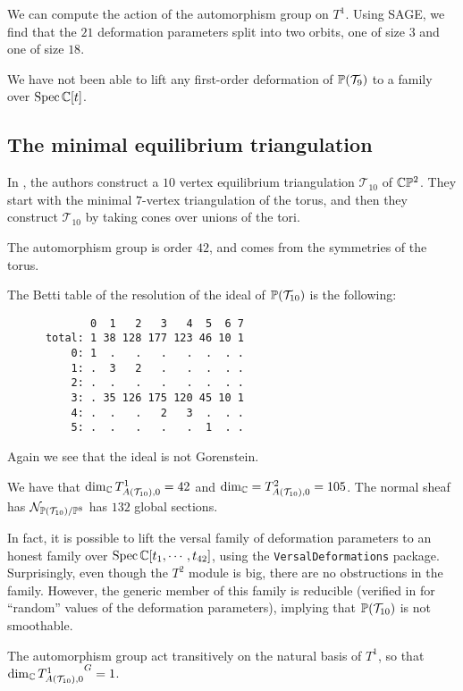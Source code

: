 We can compute the action of the automorphism group on $T^1$. Using SAGE, we find that the $21$ deformation parameters split into two orbits, one of size $3$ and one of size $18$.

We have not been able to lift any first-order deformation of $\P(\mathcal T_9)$ to a family over $\Spec \C[t]$. 

\subsection{The minimal equilibrium triangulation}

In \cite{banchoff_equilibrium}, the authors construct a $10$ vertex equilibrium triangulation $\mathcal T_{10}$  of $\C \P^2$. They start with the minimal $7$-vertex triangulation of the torus, and then they construct $\mathcal T_{10}$ by taking cones over unions of the tori.

The automorphism group is order $42$, and comes from the symmetries of the torus. 

The Betti table of the resolution of the ideal of $\P(\mathcal T_{10})$ is the following:
\begin{verbatim}
             0  1   2   3   4  5  6 7
      total: 1 38 128 177 123 46 10 1
          0: 1  .   .   .   .  .  . .
          1: .  3   2   .   .  .  . .
          2: .  .   .   .   .  .  . .
          3: . 35 126 175 120 45 10 1
          4: .  .   .   2   3  .  . .
          5: .  .   .   .   .  1  . .
\end{verbatim}

Again we see that the ideal is not Gorenstein.

\begin{proposition}
We have that $\dim_\C  T^1_{A(\mathcal T_{10}),0}=42$ and $\dim_\C = T^2_{A(\mathcal T_{10}),0}=105$. The normal sheaf has $\mathcal N_{\P(\mathcal T_{10})/\P^{8}}$ has $132$ global sections.
\end{proposition}

In fact, it is possible to lift the versal family of deformation parameters to an honest family over $\Spec \C[t_1,\cdots,t_{42}]$, using the \texttt{VersalDeformations} package. Surprisingly, even though the $T^2$ module is big, there are no obstructions in the family. However, the generic member of this family is reducible (verified in \MM for ``random'' values of the deformation parameters), implying that $\P(\mathcal T_{10})$ is not smoothable.

The automorphism group act transitively on the natural basis of $T^1$, so that $\dim_\C {T^1_{A(\mathcal T_{10}),0}}^G=1$. 

